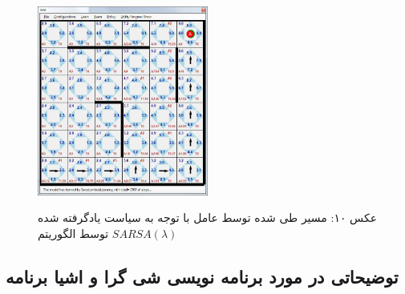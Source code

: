 \documentclass[10pt,a4paper]{article}
\begin{document}
\begin{figure}[H]
    \centering
    \includegraphics[width=0.5\textwidth]{rlambda-exec}
    \begin{center}
    \textarabic{عکس ۱۰: مسیر طی شده توسط عامل با توجه به سیاست یادگرفته شده توسط الگوریتم $SARSA(\lambda)$ }
    \end{center}
\end{figure}

\begin{Arabic}
\section{\textarabic{توضیحاتی در مورد برنامه نویسی شی گرا و اشیا برنامه}}
\end{Arabic}
\end{document}
